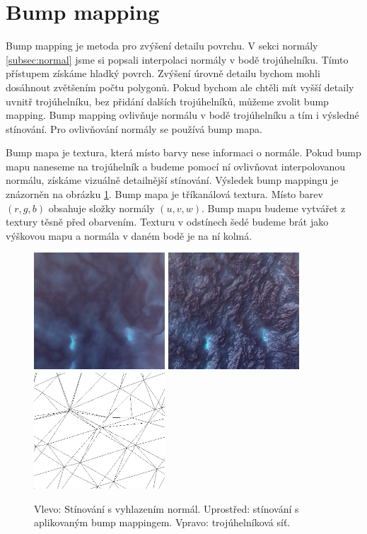 
\section{Bump mapping}

Bump mapping je metoda pro zvýšení detailu povrchu.
V sekci normály \ref{subsec:normal} jsme si popsali interpolaci normály v bodě trojúhelníku.
Tímto přístupem získáme hladký povrch.
Zvýšení úrovně detailu bychom mohli dosáhnout zvětšením počtu polygonů.
Pokud bychom ale chtěli mít vyšší detaily uvnitř trojúhelníku, bez  přidání dalších trojúhelníků, můžeme zvolit bump mapping.
Bump mapping ovlivňuje normálu v bodě trojúhelníku a tím i výsledné stínování.
Pro ovlivňování normály se používá bump mapa.

Bump mapa je textura, která místo barvy nese informaci o normále.
Pokud bump mapu naneseme na trojúhelník a budeme pomocí ní ovlivňovat interpolovanou normálu, získáme vizuálně detailnější stínování.
Výsledek bump mappingu je znázorněn na obrázku \ref{fig:bump0}.
Bump mapa je tříkanálová textura.
Místo barev $(r,g,b)$ obsahuje složky normály $(u,v,w)$.
Bump mapu budeme vytvářet z textury těsně před obarvením.
Texturu v odstínech šedé budeme brát jako výškovou mapu a normála v daném bodě je na ní kolmá.
\begin{figure}[h]
\centering
\includegraphics[width=4.9cm,keepaspectratio]{obr/bump0.jpg}
\includegraphics[width=4.9cm,keepaspectratio]{obr/bump1.jpg}
\includegraphics[width=4.9cm,keepaspectratio]{obr/bump2.jpg}
\caption{
Vlevo: Stínování s vyhlazením normál.
Uprostřed: stínování s aplikovaným bump mappingem.
Vpravo: trojúhelníková síť.}
\label{fig:bump0}
\end{figure}




